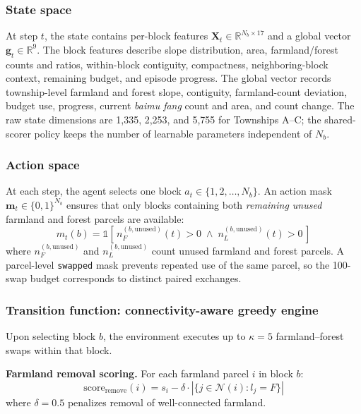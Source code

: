 \documentclass[preprint,12pt]{elsarticle}
\begin{document}
\subsubsection{State space}

At step $t$, the state contains per-block features $\mathbf{X}_t\in\mathbb{R}^{N_b\times17}$ and a global vector $\mathbf{g}_t\in\mathbb{R}^{9}$. The block features describe slope distribution, area, farmland/forest counts and ratios, within-block contiguity, compactness, neighboring-block context, remaining budget, and episode progress. The global vector records township-level farmland and forest slope, contiguity, farmland-count deviation, budget use, progress, current \textit{baimu fang} count and area, and count change. The raw state dimensions are 1{,}335, 2{,}253, and 5{,}755 for Townships A--C; the shared-scorer policy keeps the number of learnable parameters independent of $N_b$.

\subsubsection{Action space}

At each step, the agent selects one block $a_t \in \{1, 2, \ldots, N_b\}$. An action mask $\mathbf{m}_t \in \{0, 1\}^{N_b}$ ensures that only blocks containing both \textit{remaining unused} farmland and forest parcels are available:
\begin{equation}
m_t(b) = \mathbb{1}\!\left[\,n_F^{(b,\text{unused})}(t) > 0 \;\wedge\; n_L^{(b,\text{unused})}(t) > 0\,\right]
\end{equation}
where $n_F^{(b,\text{unused})}$ and $n_L^{(b,\text{unused})}$ count unused farmland and forest parcels. A parcel-level \texttt{swapped} mask prevents repeated use of the same parcel, so the 100-swap budget corresponds to distinct paired exchanges.

\subsubsection{Transition function: connectivity-aware greedy engine}
\label{sec:greedy_engine}

Upon selecting block $b$, the environment executes up to $\kappa=5$ farmland--forest swaps within that block.

\textbf{Farmland removal scoring.} For each farmland parcel $i$ in block $b$:
\begin{equation}
\text{score}_{\text{remove}}(i) = s_i - \delta \cdot |\{j \in \mathcal{N}(i) : l_j = F\}|
\label{eq:score_remove}
\end{equation}
where $\delta=0.5$ penalizes removal of well-connected farmland.
\end{document}
